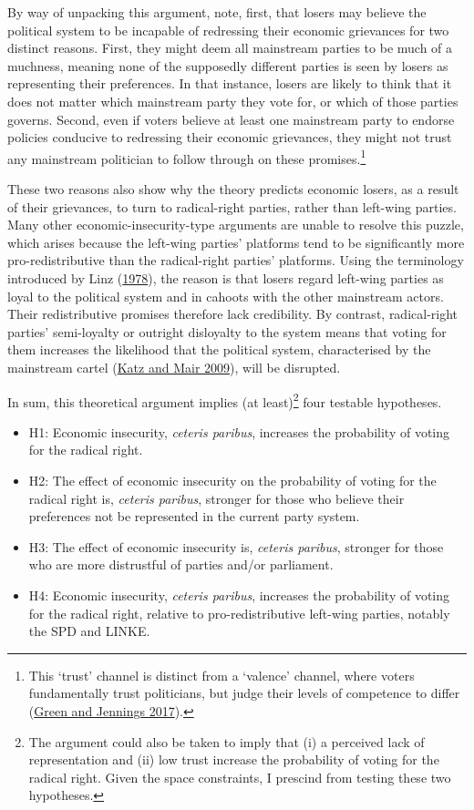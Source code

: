 \documentclass[
]{article}
\providecommand{\tightlist}{%
  \setlength{\itemsep}{0pt}\setlength{\parskip}{0pt}}
\begin{document}
By way of unpacking this argument, note, first, that losers may believe
the political system to be incapable of redressing their economic
grievances for two distinct reasons. First, they might deem all
mainstream parties to be much of a muchness, meaning none of the
supposedly different parties is seen by losers as representing their
preferences. In that instance, losers are likely to think that it does
not matter which mainstream party they vote for, or which of those
parties governs. Second, even if voters believe at least one mainstream
party to endorse policies conducive to redressing their economic
grievances, they might not trust any mainstream politician to follow
through on these promises.\footnote{This `trust' channel is distinct
  from a `valence' channel, where voters fundamentally trust
  politicians, but judge their levels of competence to differ
  (\protect\hyperlink{ref-green_politics_2017}{Green and Jennings
  2017}).}

These two reasons also show why the theory predicts economic losers, as
a result of their grievances, to turn to radical-right parties, rather
than left-wing parties. Many other economic-insecurity-type arguments
are unable to resolve this puzzle, which arises because the left-wing
parties' platforms tend to be significantly more pro-redistributive than
the radical-right parties' platforms. Using the terminology introduced
by Linz (\protect\hyperlink{ref-linz_breakdown_1978}{1978}), the reason
is that losers regard left-wing parties as loyal to the political system
and in cahoots with the other mainstream actors. Their redistributive
promises therefore lack credibility. By contrast, radical-right parties'
semi-loyalty or outright disloyalty to the system means that voting for
them increases the likelihood that the political system, characterised
by the mainstream cartel (\protect\hyperlink{ref-katz_cartel_2009}{Katz
and Mair 2009}), will be disrupted.

In sum, this theoretical argument implies (at least)\footnote{The
  argument could also be taken to imply that (i) a perceived lack of
  representation and (ii) low trust increase the probability of voting
  for the radical right. Given the space constraints, I prescind from
  testing these two hypotheses.} four testable hypotheses.

\begin{itemize}
\tightlist
\item
  H1: Economic insecurity, \emph{ceteris paribus}, increases the
  probability of voting for the radical right.
\item
  H2: The effect of economic insecurity on the probability of voting for
  the radical right is, \emph{ceteris paribus}, stronger for those who
  believe their preferences not be represented in the current party
  system.
\item
  H3: The effect of economic insecurity is, \emph{ceteris paribus},
  stronger for those who are more distrustful of parties and/or
  parliament.
\item
  H4: Economic insecurity, \emph{ceteris paribus}, increases the
  probability of voting for the radical right, relative to
  pro-redistributive left-wing parties, notably the SPD and LINKE.
\end{itemize}
\end{document}
